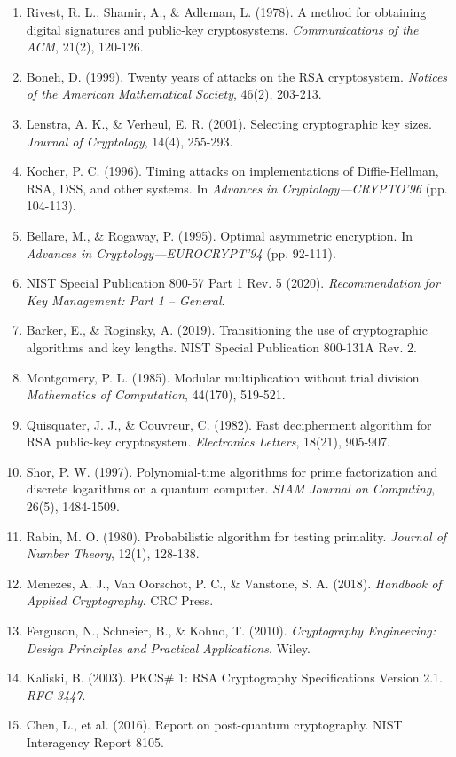 \documentclass[a4paper, 11pt]{article}
\begin{document}
\begin{enumerate}
\item Rivest, R. L., Shamir, A., \& Adleman, L. (1978). A method for obtaining digital signatures
and public-key cryptosystems. \textit{Communications of the ACM}, 21(2), 120-126.

\item Boneh, D. (1999). Twenty years of attacks on the RSA cryptosystem. \textit{Notices of the
American Mathematical Society}, 46(2), 203-213.

\item Lenstra, A. K., \& Verheul, E. R. (2001). Selecting cryptographic key sizes.
\textit{Journal of Cryptology}, 14(4), 255-293.

\item Kocher, P. C. (1996). Timing attacks on implementations of Diffie-Hellman, RSA, DSS, and
other systems. In \textit{Advances in Cryptology—CRYPTO'96} (pp. 104-113).

\item Bellare, M., \& Rogaway, P. (1995). Optimal asymmetric encryption. In \textit{Advances in
Cryptology—EUROCRYPT'94} (pp. 92-111).

\item NIST Special Publication 800-57 Part 1 Rev. 5 (2020). \textit{Recommendation for Key
Management: Part 1 – General}.

\item Barker, E., \& Roginsky, A. (2019). Transitioning the use of cryptographic algorithms and
key lengths. NIST Special Publication 800-131A Rev. 2.

\item Montgomery, P. L. (1985). Modular multiplication without trial division.
\textit{Mathematics of Computation}, 44(170), 519-521.

\item Quisquater, J. J., \& Couvreur, C. (1982). Fast decipherment algorithm for RSA public-key
cryptosystem. \textit{Electronics Letters}, 18(21), 905-907.

\item Shor, P. W. (1997). Polynomial-time algorithms for prime factorization and discrete
logarithms on a quantum computer. \textit{SIAM Journal on Computing}, 26(5), 1484-1509.

\item Rabin, M. O. (1980). Probabilistic algorithm for testing primality.
\textit{Journal of Number Theory}, 12(1), 128-138.

\item Menezes, A. J., Van Oorschot, P. C., \& Vanstone, S. A. (2018). \textit{Handbook of
Applied Cryptography}. CRC Press.

\item Ferguson, N., Schneier, B., \& Kohno, T. (2010). \textit{Cryptography Engineering: Design
Principles and Practical Applications}. Wiley.

\item Kaliski, B. (2003). PKCS\# 1: RSA Cryptography Specifications Version 2.1.
\textit{RFC 3447}.

\item Chen, L., et al. (2016). Report on post-quantum cryptography. NIST Interagency Report 8105.
\end{enumerate}
\end{document}
